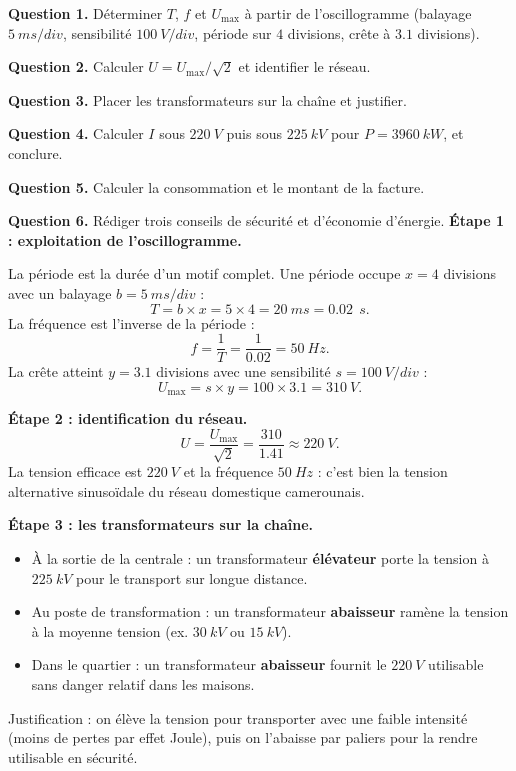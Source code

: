 \documentclass[11pt]{article}
\newcounter{popsec}
\newcounter{popsub}
\newcommand{\courssub}[1]{%
  \stepcounter{popsub}%
  \par\vspace{9pt}\noindent{\popxbold\fontsize{11.5}{13}\selectfont\color{popink}{\color{poporange}\thepopsec.\thepopsub}\hspace{6pt}#1}\par\nopagebreak\vspace{4pt}
}
\begin{document}
\courssub{Démarche et corrigé commenté}

\begin{exoresolu}
\textbf{Question 1.} Déterminer $T$, $f$ et $U_{\max}$ à partir de l'oscillogramme (balayage $\SI{5}{ms/div}$, sensibilité $\SI{100}{V/div}$, période sur $4$ divisions, crête à $\num{3,1}$ divisions).

\textbf{Question 2.} Calculer $U = U_{\max}/\sqrt{2}$ et identifier le réseau.

\textbf{Question 3.} Placer les transformateurs sur la chaîne et justifier.

\textbf{Question 4.} Calculer $I$ sous $\SI{220}{V}$ puis sous $\SI{225}{kV}$ pour $P = \SI{3960}{kW}$, et conclure.

\textbf{Question 5.} Calculer la consommation et le montant de la facture.

\textbf{Question 6.} Rédiger trois conseils de sécurité et d'économie d'énergie.
\tcblower
\textbf{Étape 1 : exploitation de l'oscillogramme.}

La période est la durée d'un motif complet. Une période occupe $x = 4$ divisions avec un balayage $b = \SI{5}{ms/div}$ :
\[
T = b \times x = 5 \times 4 = \SI{20}{ms} = \num{0,02}\ \SI{}{s}.
\]
La fréquence est l'inverse de la période :
\[
f = \frac{1}{T} = \frac{1}{\num{0,02}} = \SI{50}{Hz}.
\]
La crête atteint $y = \num{3,1}$ divisions avec une sensibilité $s = \SI{100}{V/div}$ :
\[
U_{\max} = s \times y = 100 \times \num{3,1} = \SI{310}{V}.
\]

\textbf{Étape 2 : identification du réseau.}
\[
U = \frac{U_{\max}}{\sqrt{2}} = \frac{310}{\num{1,41}} \approx \SI{220}{V}.
\]
La tension efficace est $\SI{220}{V}$ et la fréquence $\SI{50}{Hz}$ : c'est bien la tension alternative sinusoïdale du réseau domestique camerounais.

\textbf{Étape 3 : les transformateurs sur la chaîne.}
\begin{itemize}
\item À la sortie de la centrale : un transformateur \textbf{élévateur} porte la tension à $\SI{225}{kV}$ pour le transport sur longue distance.
\item Au poste de transformation : un transformateur \textbf{abaisseur} ramène la tension à la moyenne tension (ex. $\SI{30}{kV}$ ou $\SI{15}{kV}$).
\item Dans le quartier : un transformateur \textbf{abaisseur} fournit le $\SI{220}{V}$ utilisable sans danger relatif dans les maisons.
\end{itemize}
Justification : on élève la tension pour transporter avec une faible intensité (moins de pertes par effet Joule), puis on l'abaisse par paliers pour la rendre utilisable en sécurité.


\end{exoresolu}
\end{document}
